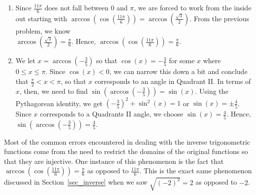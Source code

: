 \begin{example}
\begin{enumerate}
		\item Since $\frac{11\pi}{6}$ does not fall between $0$ and $\pi$, we are forced to work from the inside out starting with  $\arccos\left( \cos\left(\frac{11\pi}{6}\right)\right) = \arccos\left(\frac{\sqrt{3}}{2}\right)$.  From the previous problem, we know \\ $\arccos\left(\frac{\sqrt{3}}{2}\right) = \frac{\pi}{6}$.  Hence,  $\arccos\left( \cos\left(\frac{11\pi}{6}\right)\right) = \frac{\pi}{6}$.
		
		\item  We let $x = \arccos\left(-\frac{3}{5}\right)$ so that  $\cos(x) = -\frac{3}{5}$ for some $x$ where  $0 \leq x \leq \pi$.  Since $\cos(x) < 0$, we can narrow this down a bit and conclude that $\frac{\pi}{2} < x < \pi$, so that $x$ corresponds to an angle in Quadrant II. In terms of $x$, then, we need to find $\sin\left(\arccos\left(-\frac{3}{5}\right)\right) = \sin(x)$.  Using the Pythagorean identity, we get $\left(-\frac{3}{5}\right)^2 + \sin^{2}(x) = 1$ or $\sin(x) = \pm \frac{4}{5}$.  Since $x$ corresponds to a Quadrants II angle, we choose  $\sin(x) = \frac{4}{5}$.  Hence,  $\sin\left(\arccos\left(-\frac{3}{5}\right)\right) = \frac{4}{5}$.
		
	\end{enumerate}
\end{example}

Most of the common errors encountered in dealing with the inverse trigonometric functions come from the need to restrict the domains of the original functions so that they are injective.  One instance of this phenomenon is the fact that $\arccos\left( \cos\left(\frac{11\pi}{6}\right)\right) = \frac{\pi}{6}$ as opposed to $\frac{11\pi}{6}$. This is the exact same phenomenon discussed in Section~\ref{sec_inverse} when we saw  $\sqrt{(-2)^2} = 2$ as opposed to $-2$.   


